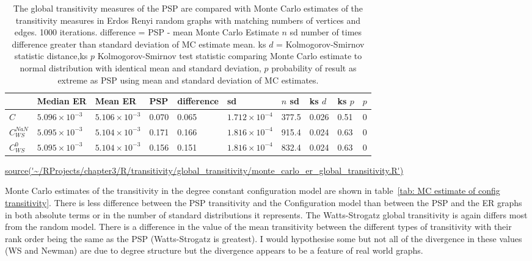 \begin{table}[ht]
\centering
\begin{adjustbox}{width=\textwidth}
\begin{tabular}{llllllllll}
  \toprule
 & Median ER & Mean ER & PSP & difference & sd & $n$ sd & ks $d$ & ks $p$ & $p$ \\ 
  \midrule
$C$ & $5.096 \times 10^{-3}$ & $5.106 \times 10^{-3}$ & 0.070 & 0.065 & $1.712 \times 10^{-4}$ & 377.5 & 0.026 & 0.51 & 0 \vspace{1mm} \\ 
  $C_{WS}^{NaN}$ & $5.095 \times 10^{-3}$ & $5.104 \times 10^{-3}$ & 0.171 & 0.166 & $1.816 \times 10^{-4}$ & 915.4 & 0.024 & 0.63 & 0 \vspace{1mm} \\ 
  $C_{WS}^0$ & $5.095 \times 10^{-3}$ & $5.104 \times 10^{-3}$ & 0.156 & 0.151 & $1.816 \times 10^{-4}$ & 832.4 & 0.024 & 0.63 & 0 \vspace{1mm}\\ 
   \bottomrule
\end{tabular}
\end{adjustbox}
\caption[Global transitivity of PSP and Monte Carlo estimates - Erdos-Renyi]{The global transitivity measures of the PSP are compared with Monte Carlo estimates of the transitivity measures in Erdos Renyi random graphs with matching numbers of vertices and edges. 1000 iterations. difference  = PSP - mean Monte Carlo Estimate $n$ sd number of times difference greater than standard deviation of MC estimate mean. ks $d$ = Kolmogorov-Smirnov statistic distance,ks $p$ Kolmogorov-Smirnov test statistic comparing Monte Carlo estimate to normal distribution with identical mean and standard deviation,  $p$ probability of result as extreme as PSP using mean and standard deviation of MC estimates.} \tiny\url{source('~/RProjects/chapter3/R/transitivity/global_transitivity/monte_carlo_er_global_transitivity.R')} 
\label{tab:MC estimate of ER transitivity}
\end{table}


Monte Carlo estimates of the transitivity in the degree constant configuration model are shown in table~\ref{tab: MC estimate of config transitivity}. There is less difference between the PSP transitivity and the Configuration model than between the PSP and the ER graphs in both absolute terms or in the number of standard distributions it represents. The Watts-Strogatz global transitivity is again differs most from the random model. There is a difference in the value of the mean transitivity between the different types of transitivity with their rank order being the same as the PSP (Watts-Strogatz is greatest). I would hypothesise some but not all of the divergence in these values (WS and Newman) are due to degree structure but the divergence appears to be a feature of real world graphs. 

